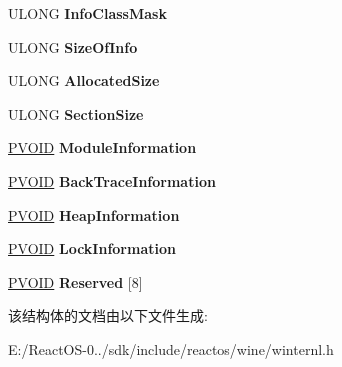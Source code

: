 \begin{DoxyCompactItemize}
\mbox{\label{struct___d_e_b_u_g___b_u_f_f_e_r_afc299a714126edc828e752cde5c749f6}} 
U\+L\+O\+NG {\bfseries Info\+Class\+Mask}
\item 
\mbox{\label{struct___d_e_b_u_g___b_u_f_f_e_r_afdf9ba5aed5966825c2a54e7ce0ad63c}} 
U\+L\+O\+NG {\bfseries Size\+Of\+Info}
\item 
\mbox{\label{struct___d_e_b_u_g___b_u_f_f_e_r_a2fdb956c8bc38c523692fcf4b4894ec6}} 
U\+L\+O\+NG {\bfseries Allocated\+Size}
\item 
\mbox{\label{struct___d_e_b_u_g___b_u_f_f_e_r_a395fd5dbcdf6776adda22bd8200655ca}} 
U\+L\+O\+NG {\bfseries Section\+Size}
\item 
\mbox{\label{struct___d_e_b_u_g___b_u_f_f_e_r_a554e579a2ade7d8bda53ac50415c54b5}} 
\hyperlink{interfacevoid}{P\+V\+O\+ID} {\bfseries Module\+Information}
\item 
\mbox{\label{struct___d_e_b_u_g___b_u_f_f_e_r_a476178ef45d75aa2b40a3a6e68a2041c}} 
\hyperlink{interfacevoid}{P\+V\+O\+ID} {\bfseries Back\+Trace\+Information}
\item 
\mbox{\label{struct___d_e_b_u_g___b_u_f_f_e_r_a31f546ad0fa98171023f8d3c31d1fb4a}} 
\hyperlink{interfacevoid}{P\+V\+O\+ID} {\bfseries Heap\+Information}
\item 
\mbox{\label{struct___d_e_b_u_g___b_u_f_f_e_r_a9705a83f229998620eeca9930eea4ec9}} 
\hyperlink{interfacevoid}{P\+V\+O\+ID} {\bfseries Lock\+Information}
\item 
\mbox{\label{struct___d_e_b_u_g___b_u_f_f_e_r_adeeaee7e73547e46bf7a96bb47dddb9f}} 
\hyperlink{interfacevoid}{P\+V\+O\+ID} {\bfseries Reserved} \mbox{[}8\mbox{]}
\end{DoxyCompactItemize}


该结构体的文档由以下文件生成\+:\begin{DoxyCompactItemize}
\item 
E\+:/\+React\+O\+S-\/0../sdk/include/reactos/wine/winternl.\+h\end{DoxyCompactItemize}
